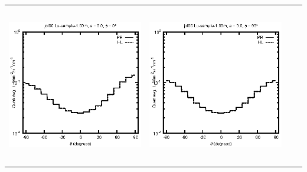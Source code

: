 \begin{tabular}{c c c c}
\includegraphics[height=7cm]{../eps/jol00_Lu_sample_1.00m_fwd.eps} &
\includegraphics[height=7cm]{../eps/jol00_Lu_sample_1.00m_cross.eps} \\
\end{tabular}

\pagebreak

